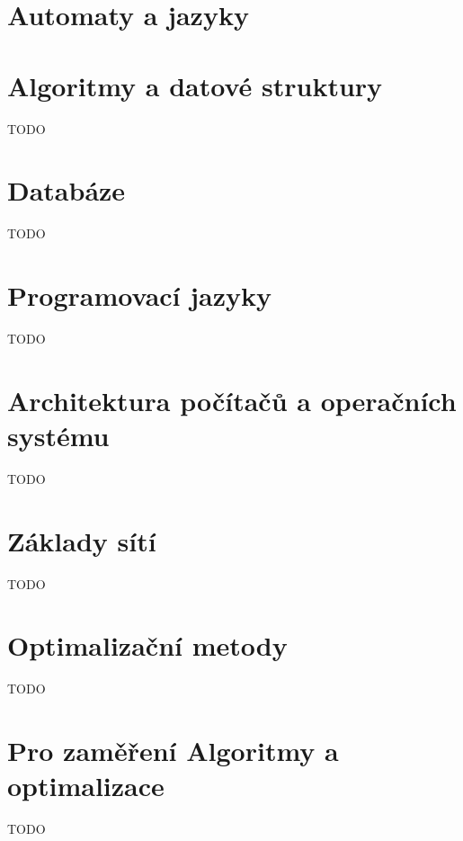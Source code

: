 


\section{Automaty a jazyky}


\section{Algoritmy a datové struktury}
TODO

\section{Databáze}
TODO

\section{Programovací jazyky}
TODO

\section{Architektura počítačů a operačních systému}
TODO

\section{Základy sítí}
TODO

\section{Optimalizační metody}
TODO

\section{Pro zaměření Algoritmy a optimalizace}
TODO

